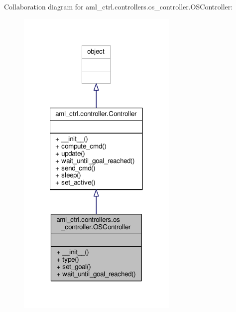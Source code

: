 Collaboration diagram for aml\-\_\-ctrl.\-controllers.\-os\-\_\-controller.\-O\-S\-Controller\-:\nopagebreak
\begin{figure}[H]
\begin{center}
\leavevmode
\includegraphics[width=218pt]{classaml__ctrl_1_1controllers_1_1os__controller_1_1_o_s_controller__coll__graph}
\end{center}
\end{figure}
